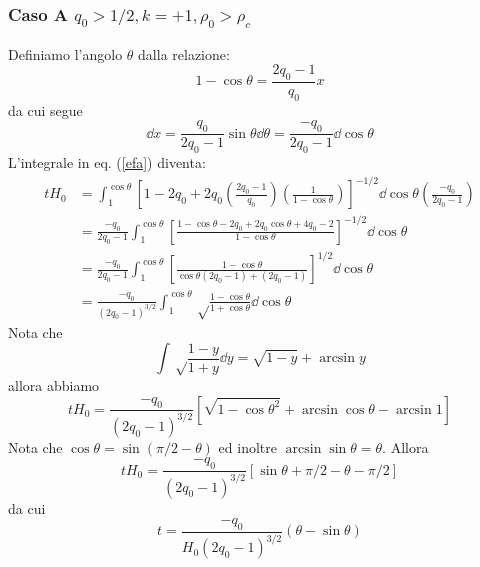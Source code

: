\subsubsection{Caso A $q_0 > 1/2,  k=+1 , \rho_0> \rho_c$}

Definiamo l'angolo $\theta$ dalla relazione:
\begin{equation}
  1-\cos \theta = \frac{2q_0-1 }{q_0} x
  \label{posizioneiniziale}
\end{equation}
da cui segue
\begin{equation}
  \dd x = \frac {q_0}{2q_0-1} \sin \theta \dd \theta =  \frac{- q_0}{2q_0-1} \dd \cos \theta
\end{equation}
L'integrale in eq. (\ref{efa}) diventa:
\begin{equation}
  \begin{split}
    t H_0 &= \int _1^{\cos \theta} \left[1-2q_0+2q_0 \left(\frac{2q_0-1}{q_0}
      \right) \left(\frac{1}{1-\cos \theta} \right) \right]^{-1/2} \dd\cos\theta
    \left(\frac{-q_0}{2q_0-1} \right) \\
    &=\frac{-q_0}{2q_0-1} \int _1^{\cos \theta} \left[
      \frac{1-\cos \theta - 2q_0 + 2q_0 \cos \theta + 4q_0 -2} {1-\cos\theta}
    \right]^{-1/2} \dd\cos\theta \\
    &=\frac {-q_0}{2q_0-1} \int _1^{\cos \theta} \left[ \frac {1-\cos \theta}
      {\cos \theta (2q_0-1) + (2q_0-1)} \right]^{1/2} \dd\cos\theta \\
    &=\frac {-q_0}{(2q_0-1)^{3/2}} \int_1^{\cos \theta} \sqrt \frac
    {1-\cos \theta} {1+\cos \theta} \dd \cos \theta
  \end{split}
\end{equation}
Nota che
\begin{equation}
  \int \sqrt \frac {1-y}{1+y} \dd y = \sqrt {1-y} + \arcsin y
\end{equation}
allora abbiamo
\begin{equation}
  t H_0 = \frac {-q_0}{(2q_0-1)^{3/2}}
  \left[ \sqrt {1-\cos\theta^2} + \arcsin \cos \theta - \arcsin 1 \right]
\end{equation}
Nota che $\cos \theta = \sin (\pi/2-\theta)$ ed inoltre
$\arcsin \sin \theta = \theta$. Allora
\begin{equation}
  t H_0= \frac {-q_0}{(2q_0-1)^{3/2}} \left[ \sin \theta + {\pi}/{2} - \theta -
    {\pi}/{2}\right]
\end{equation}
da cui
\begin{equation}
  t = \frac {-q_0}{H_0(2q_0-1)^{3/2}} ( \theta - \sin \theta )
  \label{sema}
\end{equation}
